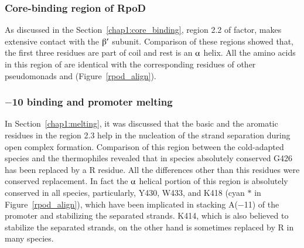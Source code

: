 \subsubsection{Core-binding region of RpoD}

As discussed in the Section~\ref{chap1:core_binding}, region 2.2
of \s{} factor, makes extensive contact with the $\betaup'$
subunit. Comparison of these regions showed that, the first three
residues are part of coil and rest is an $\alphaup$ helix. All the
amino acids in this region of \lzsiga{} are identical with the
corresponding residues of other pseudomonads and 
(Figure~\ref{rpod_align}).

\subsubsection{$-$10 binding and promoter melting}

In Section~\ref{chap1:melting}, it was discussed that the basic
and the aromatic residues in the region 2.3 help in the nucleation
of the strand separation during open complex formation. Comparison
of this region between the cold-adapted species and the
thermophiles revealed that in  species absolutely
conserved G426 has been replaced by a R residue. All the
differences other than this residues were conserved replacement.
In fact the $\alphaup$ helical portion of this region is
absolutely conserved in all species, particularly, Y430, W433, and
K418 (cyan $\ast$ in Figure~\ref{rpod_align}), which have been
implicated in stacking A($-$11) of the promoter and stabilizing
the separated strands. K414, which is also believed to stabilize
the separated strands, on the other hand is sometimes replaced by
R in many species.

